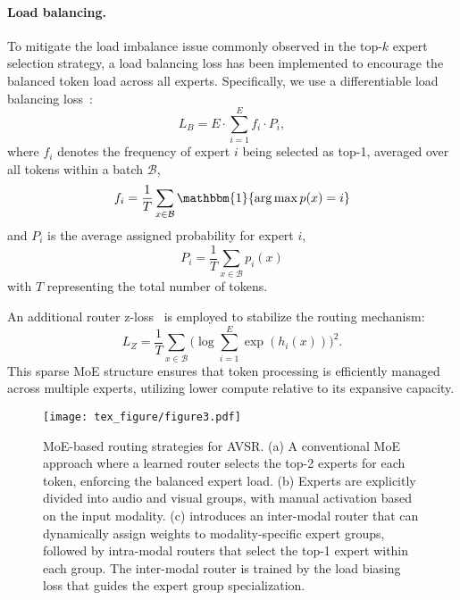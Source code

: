 \vspace*{-8pt}
\paragraph{Load balancing.}
To mitigate the load imbalance issue commonly observed in the top-$k$ expert selection strategy, a load balancing loss has been implemented to encourage the balanced token load across all experts. Specifically, we use a differentiable load balancing loss~\citep{fedus2022switch}:
\begin{equation}
    L_B = E \cdot \sum_{i=1}^E f_i \cdot P_i,
\end{equation}
where $f_i$ denotes the frequency of expert $i$ being selected as top-1, averaged over all tokens within a batch $\mathcal{B}$,
\begin{equation}
\label{eq:expert_frequency}
    f_i = \frac{1}{T} \sum_{x\in\mathcal{B}} \mathbbm{1} \{\arg\max p(x) = i\}
\end{equation}
and $P_i$ is the average assigned probability for expert $i$,
\begin{equation}
\label{eq:expert_probability}
    P_i = \frac{1}{T} \sum_{x\in\mathcal{B}} p_i(x)
\end{equation}
with $T$ representing the total number of tokens.

An additional router z-loss~\citep{zoph2022st} is employed to stabilize the routing mechanism:
\begin{equation}
    L_Z = \frac{1}{T}\sum_{x\in\mathcal{B}} \Bigg(\log \sum_{i=1}^E \exp(h_i(x)) \Bigg)^2.
\end{equation}
This sparse MoE structure ensures that token processing is efficiently managed across multiple experts, utilizing lower compute relative to its expansive capacity.


\begin{figure*}[!t]
    \centering
    \texttt{[image: tex\_figure/figure3.pdf]}
    \vspace{-5pt}
    \caption{MoE-based routing strategies for AVSR. 
    (a) A conventional MoE approach where a learned router selects the top-2 experts for each token, enforcing the balanced expert load. 
    (b) Experts are explicitly divided into audio and visual groups, with manual activation based on the input modality.
    (c) \ourmodel introduces an inter-modal router that can dynamically assign weights to modality-specific expert groups, followed by intra-modal routers that select the top-1 expert within each group. The inter-modal router is trained by the load biasing loss that guides the expert group specialization.
    }
    \label{fig:routing}
\end{figure*}
